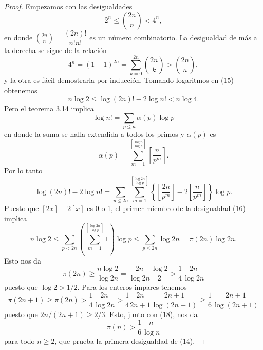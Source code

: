 \documentclass[12pt,a4paper]{book}
\begin{document}
    \begin{proof}
        Empezamos con las desigualdades
        \begin{equation}
            2^{n}\leq\binom{2n}{n}<4^{n},
        \end{equation}
        en donde $\binom{2n}{n}=\dfrac{(2n)!}{n!n!}$ es un número combinatorio. La
        desigualdad de más a la derecha se sigue de la relación
        \begin{equation*}
            4^{n}=(1+1)^{2n}=\sum_{k=0}^{2n}\binom{2n}{k}>\binom{2n}{n},
        \end{equation*}
        y la otra es fácil demostrarla por inducción. Tomando logaritmos en (15)
        obtenemos
        \begin{equation}
            n\log2\leq\log(2n)!-2\log n!<n\log4.
        \end{equation}
        Pero el teorema 3.14 implica
        \begin{equation*}
            \log n!=\sum_{p\leq n}\alpha(p)\log p
        \end{equation*}
        en donde la suma se halla extendida a todos los primos y $\alpha(p)$ es
        \begin{equation*}
            \alpha(p)=\sum_{m=1}^{\left[\frac{\log n}{\log p}\right]}\left[\frac{n}{p^{m}}\right].
        \end{equation*}
        Por lo tanto
        \begin{equation}
            \log(2n)!-2\log n!=\sum_{p\leq2n}\sum_{m=1}^{\left[\frac{\log2n}{\log p}\right]}
            \left\{\left[\frac{2n}{p^{m}}\right]-2\left[\frac{n}{p^{m}}\right]\right\}\log p.
        \end{equation}
        Puesto que $[2x]-2[x]$ es 0 o 1, el primer miembro de la desigualdad (16)
        implica
        \begin{equation*}
            n\log2\leq\sum_{p<2n}\left(\sum_{m=1}^{\left[\frac{\log2n}{\log p}\right]}1\right)\log p
            \leq\sum_{p\leq2n}\log2n=\pi(2n)\log2n.
        \end{equation*}
        Esto nos da
        \begin{equation}
            \pi(2n)\geq\frac{n\log2}{\log2n}=\frac{2n}{\log2n}\frac{\log2}{2}
            >\frac{1}{4}\frac{2n}{\log2n}
        \end{equation}
        puesto que $\log2>1/2$. Para los enteros impares tenemos
        \begin{equation*}
            \pi(2n+1)\geq\pi(2n)>\frac{1}{4}\frac{2n}{\log2n}>\frac{1}{4}\frac{2n}{2n+1}
            \frac{2n+1}{\log(2n+1)}\geq\frac{1}{6}\frac{2n+1}{\log(2n+1)}
        \end{equation*}
        puesto que $2n/(2n+1)\geq2/3$. Esto, junto con (18), nos da
        \begin{equation*}
            \pi(n)>\frac{1}{6}\frac{n}{\log n}
        \end{equation*}
        para todo $n\geq2$, que prueba la primera desigualdad de (14).


\end{proof}
\end{document}
